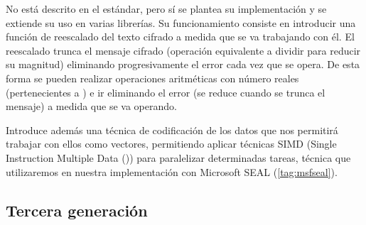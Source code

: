 \begin{itemize}
    No está descrito en el estándar, pero sí se plantea su implementación y se extiende su uso en varias librerías. Su funcionamiento consiste en introducir una función de reescalado del texto cifrado a medida que se va trabajando con él. El reescalado trunca el mensaje cifrado (operación equivalente a dividir para reducir su magnitud) eliminando progresivamente el error cada vez que se opera. De esta forma se pueden realizar operaciones aritméticas con número reales (pertenecientes a ) e ir eliminando el error (se reduce cuando se trunca el mensaje) a medida que se va operando.

    Introduce además una técnica de codificación de los datos que nos permitirá trabajar con ellos como vectores, permitiendo aplicar técnicas SIMD (Single Instruction Multiple Data (\cite{wikipedia_contributors._simd_2017})) para paralelizar determinadas tareas, técnica que utilizaremos en nuestra implementación con Microsoft SEAL (\ref{tag:msfseal}).

\end{itemize}

\subsection{Tercera generación}

